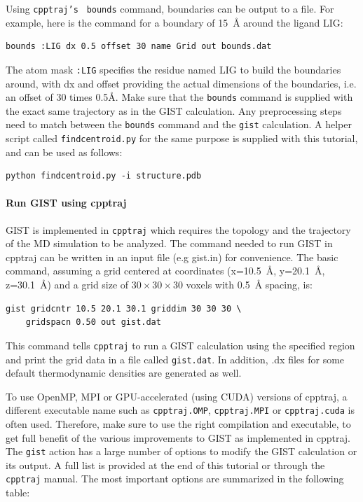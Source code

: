 \documentclass[9pt,tutorial]{livecoms}
\newcommand{\software}{\texttt}
\newcommand\inlinecode{\texttt}
\begin{document}
Using \inlinecode{cpptraj's } \inlinecode{bounds} command, boundaries can be output to a file. 
For example, here is the command for a boundary of \qty{15}{\angstrom} around the ligand LIG:
\begin{lstlisting}[style=cpptraj]
bounds :LIG dx 0.5 offset 30 name Grid out bounds.dat
\end{lstlisting}
The atom mask \inlinecode{:LIG} specifies the residue named LIG to build the boundaries around, with dx and offset providing the actual dimensions of the boundaries, i.e. an offset of 30 times 0.5Å.
Make sure that the \inlinecode{bounds} command is supplied with the exact same trajectory as in the GIST calculation. 
Any preprocessing steps need to match between the \inlinecode{bounds} command and the \inlinecode{gist} calculation. 
A helper script called \inlinecode{findcentroid.py} for the same purpose is supplied with this tutorial, and can be used as follows:
\begin{lstlisting}[style=bash]
python findcentroid.py -i structure.pdb
\end{lstlisting}
\paragraph{Run GIST using cpptraj}
GIST is implemented in \software{cpptraj} which requires the topology and the trajectory of the MD simulation to be analyzed.
The command needed to run GIST in cpptraj can be written in an input file (e.g gist.in) for convenience.
The basic command, assuming a grid centered at coordinates (x=\qty{10.5}{\angstrom}, y=\qty{20.1}{\angstrom}, z=\qty{30.1}{\angstrom}) and a grid size of $30\times30\times30$ voxels with \qty{0.5}{\angstrom} spacing, is:

\begin{lstlisting}[style=cpptraj]
gist gridcntr 10.5 20.1 30.1 griddim 30 30 30 \
	gridspacn 0.50 out gist.dat
\end{lstlisting}
This command tells \software{cpptraj} to run a GIST calculation using the specified region and print the grid data in a file called \inlinecode{gist.dat}.
In addition, .dx files for some default thermodynamic densities are generated as well.

To use OpenMP, MPI or GPU-accelerated (using CUDA) versions of cpptraj, a different executable name such as \inlinecode{cpptraj.OMP}, \inlinecode{cpptraj.MPI} or \inlinecode{cpptraj.cuda} is often used.
Therefore, make sure to use the right compilation and executable, to get full benefit of the various improvements to GIST as implemented in cpptraj.
The \inlinecode{gist} action has a large number of options to modify the GIST calculation or its output.
A full list is provided at the end of this tutorial or through the \software{cpptraj} manual.
The most important options are summarized in the following table:
\end{document}
